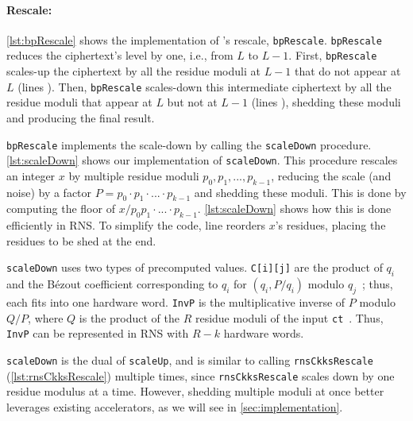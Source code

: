 

\paragraph{Rescale:}
\autoref{lst:bpRescale} shows the implementation of \name's rescale,
\texttt{bpRescale}.
\texttt{bpRescale} reduces the ciphertext's level by one, i.e., from $L$
to $L-1$.
First, \texttt{bpRescale} scales-up the ciphertext by all the residue moduli at
$L-1$ that do not appear at $L$ (lines ).
Then, \texttt{bpRescale} scales-down this intermediate ciphertext by all the
residue moduli that appear at $L$ but not at $L-1$ (lines ), shedding
these moduli and producing the final result.

\texttt{bpRescale} implements the scale-down by calling the \texttt{scaleDown}
procedure.
\autoref{lst:scaleDown} shows our implementation of \texttt{scaleDown}.
This procedure rescales an integer $x$ by multiple residue moduli
${p_{0},p_{1},...,p_{k-1}}$, reducing the scale (and noise) by a factor
$P = p_{0} \cdot p_{1} \cdot ... \cdot p_{k-1}$ and shedding these moduli.
This is done by computing the floor of
$x/{p_{0}p_{1}\cdot...\cdot p_{k-1}}$.
\autoref{lst:scaleDown} shows how this is done efficiently in RNS.
To simplify the code, line  reorders $x$'s residues, placing the
residues to be shed at the end.

\texttt{scaleDown} uses two types of precomputed values.
\texttt{C[i][j]} are the product of $q_i$ and
the B\'ezout coefficient corresponding to $q_i$ for $(q_i, P/q_i)$ modulo
$q_j$~\cite{bajard2017full};
thus, each  fits into one hardware word.
\texttt{InvP} is the multiplicative inverse of $P$ modulo $Q/P$, where $Q$ is
the product of the $R$ residue moduli of the input
\texttt{ct}~\cite{bajard2017full}.
Thus, \texttt{InvP} can be represented in RNS with $R-k$ hardware words.

\texttt{scaleDown} is the dual of \texttt{scaleUp}, and is similar to calling
\texttt{rnsCkksRescale} (\autoref{lst:rnsCkksRescale}) multiple times, since
\texttt{rns\-Ckks\-Rescale} scales down by one residue modulus at a time.
However, shedding multiple moduli at once better leverages existing
accelerators, as we will see in \autoref{sec:implementation}.

\figBpModDown

